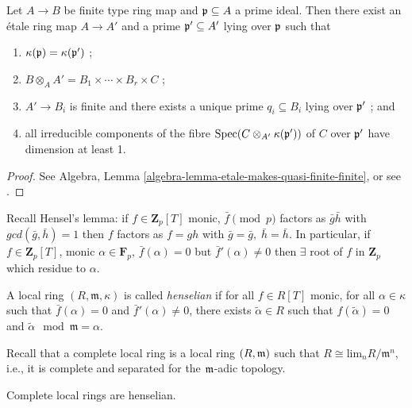 \begin{theorem}
\label{theorem-quasi-finite-etale-locally}
Let $A\to B$ be finite type ring map and $\frak p \subseteq A$ a prime ideal.
Then there exist an \'etale ring map $A \to A'$ and a prime $\frak p' \subseteq
A'$ lying over $\frak p$ such that
\begin{enumerate}
\item
$\kappa(\frak p) = \kappa(\frak p')$ ;
\item
$ B \otimes_A A' = B_1\times \cdots \times B_r \times C$ ;
\item
$ A'\to B_i$ is finite and there exists a unique prime $q_i\subseteq B_i$ lying
over $\frak p'$ ; and
\item
all irreducible components of the fibre $\text{Spec}(C\otimes_{A'} \kappa(\frak
p'))$ of $C$ over $\frak p'$ have dimension at least 1.
\end{enumerate}
\end{theorem}

\begin{proof}
See Algebra, Lemma \ref{algebra-lemma-etale-makes-quasi-finite-finite}, or
see \cite[Th\'eor\`eme 18.12.1]{EGA4}.
\end{proof}

\noindent
Recall Hensel's lemma: if $f\in \mathbf{Z}_p[T]$ monic, $\bar{f}\pmod{p}$
factors as $\bar g\bar h$ with $gcd(\bar{g}, \bar{h})=1$ then $f$ factors
as $f = gh$ with $\bar{g}=\bar{g}, \; \bar{h}=\bar{h}$.
In particular, if $f \in \mathbf{Z}_p[T]$, monic
$\alpha\in \mathbf{F}_p$, $\bar f(\alpha) =0$ but $\bar f'(\alpha)\neq 0$
then $\exists $ root of $f$ in $\mathbf{Z}_p$ which residue to $\alpha$.


\begin{definition}
\label{definition-henselian}
A local ring $(R, \mathfrak m, \kappa)$ is called {\it henselian} if for all
$f\in R[T]$ monic, for all $\alpha\in \kappa$ such that $\bar f(\alpha)=0$ and
$\bar f'(\alpha)\neq 0$, there exists $\tilde\alpha\in R$ such that
$f(\tilde\alpha) = 0$ and $\tilde\alpha\mod\mathfrak m = \alpha$.
\end{definition}

\noindent
Recall that a complete local ring is a local ring $(R, \frak m)$ such that
$R\cong \text{lim}_n R/\mathfrak m^n$, i.e., it is complete and separated
for the $\frak m$-adic topology.

\begin{theorem}
\label{theorem-hensel}
Complete local rings are henselian.
\end{theorem}

